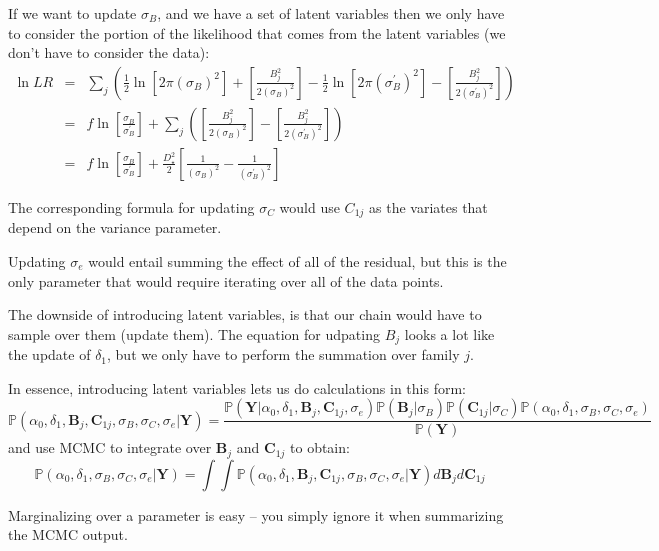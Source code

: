 \documentclass[11pt]{article}
\renewcommand{\Pr}{{\mathbb P}}
\begin{document}
If we want to update $\sigma_B$, and we have a set of latent variables then we only have to consider the portion of the likelihood that comes from the latent variables (we don't have to consider the data):
\begin{eqnarray*}
\ln LR & = & \sum_j \left(\frac{1}{2}\ln\left[2\pi(\sigma_B)^2\right] + \left[{\frac{B_j^2}{2(\sigma_B)^2}}\right] -\frac{1}{2}\ln\left[2\pi(\sigma_B^{\prime})^2\right] - \left[{\frac{B_j^2}{2(\sigma_B^{\prime})^2}}\right]\right) \\
& = & f  \ln\left[\frac{\sigma_B}{\sigma_B^{\prime}}\right] + \sum_j \left( \left[{\frac{B_j^2}{2(\sigma_B)^2}}\right]  - \left[{\frac{B_j^2}{2(\sigma_B^{\prime})^2}}\right]\right) \\
& = & f  \ln\left[\frac{\sigma_B}{\sigma_B^{\prime}}\right] + \frac{D_{\star}^2}{2}\left[{\frac{1}{(\sigma_B)^2}} - {\frac{1}{(\sigma_B^{\prime})^2}}\right]
\end{eqnarray*}

The corresponding formula for updating $\sigma_C$  would use $C_{1j}$ as the variates that depend on the variance parameter.

Updating $\sigma_e$ would entail summing the effect of all of the residual, but this is the only parameter that would require iterating over all of the data points.

The downside of introducing latent variables, is that our chain would have to sample over them (update them).
The equation for udpating $B_j$ looks a lot like the update of $\delta_1$, but we only have to perform the summation over family $j$.


In essence, introducing latent variables lets us do calculations in this form:
$$\Pr(\alpha_0,\delta_1, \bm B_j, \bm C_{1j}, \sigma_B, \sigma_C, \sigma_e | \bm Y) = \frac{\Pr(\bm Y|\alpha_0,\delta_1, \bm B_j, \bm C_{1j}, \sigma_e)\Pr(\bm B_j|\sigma_B)\Pr(\bm C_{1j}|\sigma_C)\Pr(\alpha_0,\delta_1, \sigma_B, \sigma_C, \sigma_e)}{\Pr(\bm Y)} $$
and use MCMC to integrate over $\bm B_j$ and $\bm C_{1j}$ to obtain:
$$\Pr(\alpha_0,\delta_1, \sigma_B, \sigma_C, \sigma_e | \bm Y) = \int\int \Pr(\alpha_0,\delta_1, \bm B_j, \bm C_{1j}, \sigma_B, \sigma_C, \sigma_e | \bm Y) d \bm B_j d \bm C_{1j} $$

Marginalizing over a parameter is easy -- you simply ignore it when summarizing the MCMC output.


\newpage

\end{document}
